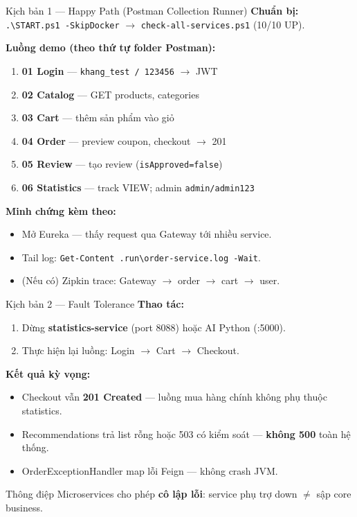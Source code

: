 \documentclass[aspectratio=169,12pt]{beamer}
\begin{document}
\begin{frame}{Kịch bản 1 — Happy Path (Postman Collection Runner)}
  \textbf{Chuẩn bị:} \texttt{.\textbackslash START.ps1 -SkipDocker} $\rightarrow$ \texttt{check-all-services.ps1} (10/10 UP).

  \vspace{0.4em}
  \textbf{Luồng demo (theo thứ tự folder Postman):}
  \begin{enumerate}\small
    \item \textbf{01 Login} — \texttt{khang\_test / 123456} $\rightarrow$ JWT
    \item \textbf{02 Catalog} — GET products, categories
    \item \textbf{03 Cart} — thêm sản phẩm vào giỏ
    \item \textbf{04 Order} — preview coupon, checkout $\rightarrow$ 201
    \item \textbf{05 Review} — tạo review (\texttt{isApproved=false})
    \item \textbf{06 Statistics} — track VIEW; admin \texttt{admin/admin123}
  \end{enumerate}

  \vspace{0.4em}
  \textbf{Minh chứng kèm theo:}
  \begin{itemize}\small
    \item Mở Eureka — thấy request qua Gateway tới nhiều service.
    \item Tail log: \texttt{Get-Content .run\textbackslash order-service.log -Wait}.
    \item (Nếu có) Zipkin trace: Gateway $\rightarrow$ order $\rightarrow$ cart $\rightarrow$ user.
  \end{itemize}
\end{frame}

\begin{frame}{Kịch bản 2 — Fault Tolerance}
  \textbf{Thao tác:}
  \begin{enumerate}\small
    \item Dừng \textbf{statistics-service} (port 8088) hoặc AI Python (:5000).
    \item Thực hiện lại luồng: Login $\rightarrow$ Cart $\rightarrow$ Checkout.
  \end{enumerate}

  \vspace{0.4em}
  \textbf{Kết quả kỳ vọng:}
  \begin{itemize}
    \item Checkout vẫn \textbf{201 Created} — luồng mua hàng chính không phụ thuộc statistics.
    \item Recommendations trả list rỗng hoặc 503 có kiểm soát — \textbf{không 500} toàn hệ thống.
    \item OrderExceptionHandler map lỗi Feign — không crash JVM.
  \end{itemize}

  \vspace{0.3em}
  \begin{block}{Thông điệp}
    Microservices cho phép \textbf{cô lập lỗi}: service phụ trợ down $\neq$ sập core business.
  \end{block}
\end{frame}
\end{document}
